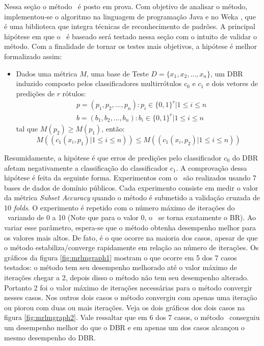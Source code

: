  Nessa seção o método \MRLMa~é posto em prova. Com objetivo de analisar o método, implementou-se o algoritmo
 na linguagem de programação Java e no Weka \cite{weka}, que é uma biblioteca que integra técnicas de reconhecimento de padrões.
 A principal hipótese em que o \MRLMa~é baseado será testado nessa seção com o intuito de validar o método.
 Com a finalidade de tornar os testes mais objetivos, a hipótese é melhor formalizado assim:
 \begin{itemize}

  \item Dados uma métrica $M$, uma base de Teste $D=\{x_1,x_2,...,x_n\}$,
  um DBR induzido composto pelos classificadores multirrótulos $c_0$ e $c_1$ e
  dois vetores de predições de $r$ rótulos:
  \begin{equation}
  \begin{split}
  & p=(p_1,p_2,...,p_n) : p_i \in {\{0,1\}}^r |1 \leq i \leq n \\
  & b=(b_1,b_2,...,b_n) : b_i \in {\{0,1\}}^r |1 \leq i \leq n
  \end{split}
  \end{equation}
  tal que $M(p_2) \geq M(p_1)$,
  então:
  \begin{equation}
  M((c_1(x_i,p_1) | 1 \leq i \leq n)) \leq M((c_1(x_i,p_2) | 1 \leq i \leq n))
  \end{equation}
 
 \end{itemize}

Resumidamente, a hipótese é que erros de predições pelo
classificador $c_0$ do DBR afetam negativamente a classificação do classificador $c_1$.
A comprovação dessa hipótese é feita da seguinte forma. Experimentos com o \MRLMa~são realizados
usando 7 bases de dados de domínio públicos. Cada experimento consiste em medir o valor da métrica \textit{Subset Accuracy}
quando o método é submetido a validação cruzada de 10 \textit{folds}.
O experimento é repetido com o número máximo de iterações do
\MRLMa~variando de 0 a 10 (Note que para o valor 0, o \MRLMa~se torna exatamente o BR).
Ao variar esse parâmetro, espera-se que o método obtenha desempenho melhor para os valores mais altos.
De fato, é o que ocorre na maioria dos casos, apesar de que o método estabiliza/converge rapidamente em relação ao
número de iterações.
Os gráficos da figura \ref{fig:mrlmgraph1} mostram o que ocorre em 5 dos 7 casos testados: o método tem seu desempenho melhorado
até o valor máximo de iterações chegar a 2, depois disso o método não tem seu desempenho alterado.
Portanto 2 foi o valor máximo de iterações necessárias para o método convergir nesses casos.
Nos outros dois casos o método convergiu com apenas uma iteração ou piorou 
com duas ou mais iterações. Veja os dois gráficos dos dois casos na figura \ref{fig:mrlmgraph2}.
Vale ressaltar que em 6 dos 7 casos, o método \MRLMa~conseguiu um desempenho melhor do que o DBR e em apenas um dos casos
alcançou o mesmo desempenho do DBR.



